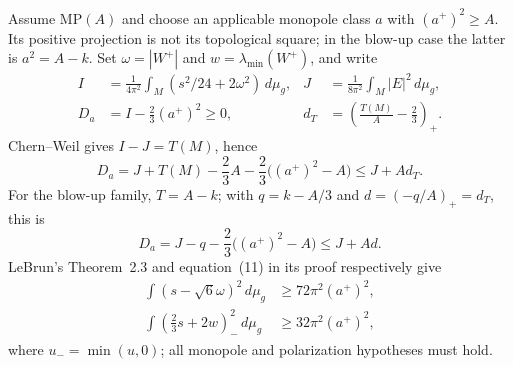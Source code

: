 \documentclass[a4paper,11pt]{article}
\numberwithin{equation}{section}
\theoremstyle{definition}
\newcommand{\dd}{\,d\mu_g}
\begin{document}
Assume $\mathrm{MP}(A)$ and choose an applicable monopole class $a$ with $(a^+)^2\ge A$. Its positive projection is not its topological square; in the blow-up case the latter is $a^2=A-k$. Set $\omega=|W^+|$ and $w=\lambda_{\min}(W^+)$, and write
\begin{align}
 I&=\frac1{4\pi^2}\int_M(s^2/24+2\omega^2)\dd,
 &J&=\frac1{8\pi^2}\int_M|E|^2\dd,\\
 D_a&=I-\frac23(a^+)^2\ge0,
 &d_T&=\left(\frac{T(M)}A-\frac23\right)_+.
\end{align}
Chern--Weil gives $I-J=T(M)$, hence
\begin{equation}\label{eq:Da-general}
D_a=J+T(M)-\frac23A-\frac23\big((a^+)^2-A\big)\le J+Ad_T.
\end{equation}
For the blow-up family, $T=A-k$; with $q=k-A/3$ and $d=(-q/A)_+=d_T$, this is
\begin{equation}\label{eq:Da}
D_a=J-q-\frac23\big((a^+)^2-A\big)\le J+Ad.
\end{equation}
LeBrun's Theorem~2.3 and equation~(11) in its proof respectively give
\begin{align}
\int(s-\sqrt6\omega)^2\dd&\ge72\pi^2(a^+)^2,\\
\int\left(\frac23s+2w\right)_{-}^{\!2}\dd&\ge32\pi^2(a^+)^2,
\end{align}
where $u_-=\min(u,0)$; all monopole and polarization hypotheses must hold\cite{LeBrun2001}.
\end{document}
